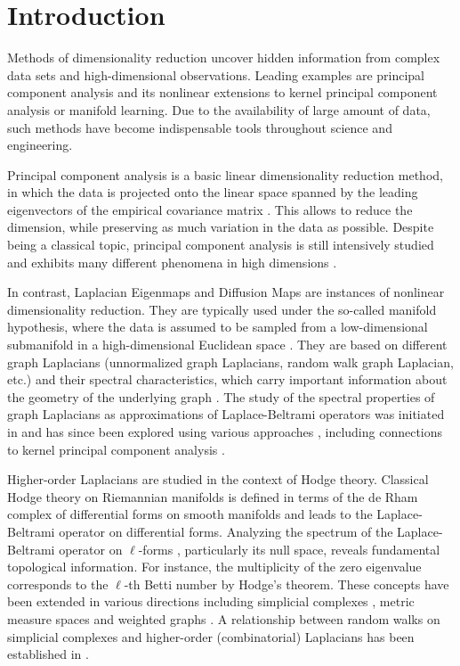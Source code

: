 \documentclass[10pt]{article}
\theoremstyle{plain}
\theoremstyle{definition}
\theoremstyle{remark}
\begin{document}
\section{Introduction}
Methods of dimensionality reduction uncover hidden information from complex data sets and high-dimensional observations. Leading examples are principal component analysis and its nonlinear extensions to kernel principal component analysis or manifold learning. Due to the availability of large amount of data, such methods have become indispensable tools throughout science and engineering. %

Principal component analysis is a basic linear dimensionality reduction method, in which the data is projected onto the linear space spanned by the leading eigenvectors of the empirical covariance matrix \cite{Joll02}. This allows to reduce the dimension, while preserving as much variation in the data as possible. Despite being a classical topic, principal component analysis is still intensively studied and exhibits many different phenomena in high dimensions \cite{JP18,Wain19,Kolt21,MR4517351}.

In contrast, Laplacian Eigenmaps and Diffusion Maps are instances of nonlinear dimensionality reduction. They are typically used under the so-called manifold hypothesis, where the data is assumed to be sampled from a low-dimensional submanifold in a high-dimensional Euclidean space \cite{Belkin03,Coifman06}. They are based on different graph Laplacians (unnormalized graph Laplacians, random walk graph Laplacian, etc.) and their spectral characteristics, which carry important information about the geometry of the underlying graph \cite{Chung97}. The study of the spectral properties of graph Laplacians as approximations of Laplace-Beltrami operators was initiated in \cite{Belkin06} and has since been explored using various approaches \cite{NIPS2006_5848ad95,Gine06,Burago14,MR4130541,MR4452681}, including connections to kernel principal component analysis \cite{Wahl24}.

Higher-order Laplacians are studied in the context of Hodge theory. Classical Hodge theory on Riemannian manifolds is defined in terms of the de Rham complex of differential forms on smooth manifolds and leads to the Laplace-Beltrami operator on differential forms. Analyzing the spectrum of the Laplace-Beltrami operator on $\ell$-forms \cite{Ros97}, particularly its null space, reveals fundamental topological information. For instance, the multiplicity of the zero eigenvalue corresponds to the $\ell$-th Betti number by Hodge's theorem. These concepts have been extended in various directions including simplicial complexes \cite{Eckmann44,Dod76}, metric measure spaces \cite{Smale12,HK24} and weighted graphs \cite{Lim20}. A relationship between random walks on simplicial complexes and higher-order (combinatorial) Laplacians has been established in \cite{Mukherjee16,MR3607124}.
\end{document}
